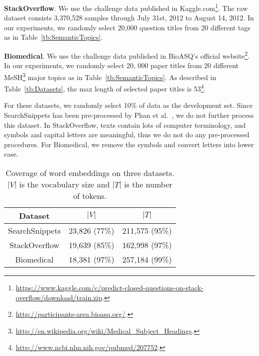 \documentclass[review]{elsarticle}
\begin{document}
{\bf{StackOverflow}}. We use the challenge data published in Kaggle.com\footnote{\url{https://www.kaggle.com/c/predict-closed-questions-on-stack-overflow/download/train.zip}.}. The raw dataset consists 3,370,528 samples through July 31st, 2012 to August 14, 2012. In our experiments, we randomly select 20,000 question titles from 20 different tags as in Table~\ref{tb:SemanticTopics}.

{\bf{Biomedical}}. We use the challenge data published in BioASQ's official website\footnote{\url{http://participants-area.bioasq.org/}.}. In our experiments, we randomly select 20, 000 paper titles from 20 different MeSH\footnote{\url{http://en.wikipedia.org/wiki/Medical_Subject_Headings}.} major topics as in Table~\ref{tb:SemanticTopics}. As described in Table~\ref{tb:Datasets}, the max length of selected paper titles is 53\footnote{\url{http://www.ncbi.nlm.nih.gov/pubmed/207752}.}.

For these datasets, we randomly select 10\% of data as the development set. Since SearchSnippets has been pre-processed by Phan et al.~\cite{20_phan2008learning}, we do not further process this dataset. In StackOverflow, texts contain lots of computer terminology, and symbols and capital letters are meaningful, thus we do not do any pre-processed procedures. For Biomedical, we remove the symbols and convert letters into lower case.



\begin{table}[t] %
\begin{center}
\begin{tabular}{|c|c|c|}\hline
      Dataset           &	$|V|$  &	$|T|$       \\\hline \hline
SearchSnippets&23,826 (77\%) &	211,575 (95\%)\\
StackOverflow&	19,639 (85\%)  &	162,998 (97\%) \\
Biomedical&18,381 (97\%) & 257,184 (99\%)\\\hline
\end{tabular}
\end{center}
\caption{\label{tb:Embeddings} Coverage of word embeddings on three datasets. $|V|$ is the vocabulary size and $|T|$ is the number of tokens.}
\end{table}
\end{document}
